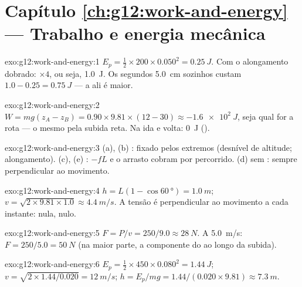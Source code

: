 \section*{Capítulo \ref{ch:g12:work-and-energy} --- Trabalho e energia mecânica}

\begin{solution}{exo:g12:work-and-energy:1}
$E_p = \tfrac12 \times 200 \times 0.050^2 = \qty{0.25}{J}$. Com o
alongamento dobrado: $\times 4$, ou seja, \qty{1.0}{J}. Os segundos
\qty{5.0}{cm} sozinhos custam $1.0 - 0.25 = \qty{0.75}{J}$ --- a 
ali é maior.
\end{solution}

\begin{solution}{exo:g12:work-and-energy:2}
$W = mg(z_A - z_B) = 0.90 \times 9.81 \times (12 - 30) \approx
\qty{-1.6e2}{J}$, seja qual for a rota --- o mesmo pela subida reta. Na
ida e volta: \qty{0}{J} ().
\end{solution}

\begin{solution}{exo:g12:work-and-energy:3}
(a), (b) :  fixado pelos extremos (desnível de
altitude; alongamento). (c), (e) : $-fL$ e o arrasto
cobram por  percorrido. (d) sem : sempre perpendicular ao
movimento.
\end{solution}

\begin{solution}{exo:g12:work-and-energy:4}
$h = L(1 - \cos\qty{60}{\degree}) = \qty{1.0}{m}$;
$v = \sqrt{2 \times 9.81 \times 1.0} \approx \qty{4.4}{m/s}$. A tensão é
perpendicular ao movimento a cada instante:  nula,  nulo.
\end{solution}

\begin{solution}{exo:g12:work-and-energy:5}
$F = P/v = 250/9.0 \approx \qty{28}{N}$. A \qty{5.0}{m/s}:
$F = 250/5.0 = \qty{50}{N}$ (na maior parte, a componente do  ao
longo da subida).
\end{solution}

\begin{solution}{exo:g12:work-and-energy:6}
$E_p = \tfrac12 \times 450 \times 0.080^2 = \qty{1.44}{J}$;
$v = \sqrt{2 \times 1.44/0.020} = \qty{12}{m/s}$;
$h = E_p/mg = 1.44/(0.020 \times 9.81) \approx \qty{7.3}{m}$.
\end{solution}

